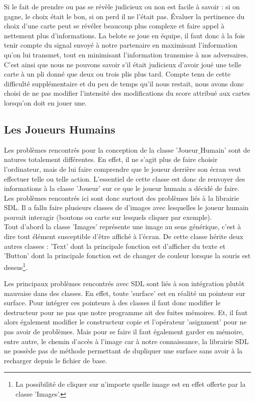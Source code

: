 \documentclass[a4paper,11pt]{article}
\begin{document}
Si le fait de prendre ou pas se révèle judicieux ou non est facile à savoir : si on gagne, le choix était le bon, si on perd il ne l'était pas. \'Evaluer la pertinence du choix d'une carte peut se révéler beaucoup plus complexe et faire appel à nettement plus d'informations. La belote se joue en équipe, il faut donc à la fois tenir compte du signal envoyé à notre partenaire en maximisant l'information qu'on lui transmet, tout en minimisant l'information transmise à nos adversaires. C'est ainsi que nous ne pouvons savoir s'il était judicieux d'avoir joué une telle carte à un pli donné que deux ou trois plis plus tard. Compte tenu de cette difficulté supplémentaire et du peu de temps qu'il nous restait, nous avons donc choisi de ne pas modifier l'intensité des modifications du score attribué aux cartes lorsqu'on doit en jouer une.
\clearpage
\subsection{Les Joueurs Humains}
Les problèmes rencontrés pour la conception de la classe 'Joueur$\_$Humain' sont de natures totalement différentes. En effet, il ne s'agit plus de faire choisir l'ordinateur, mais de lui faire comprendre que le joueur derrière son écran veut effectuer telle ou telle action. L'essentiel de cette classe est donc de renvoyer des informations à la classe 'Joueur' sur ce que le joueur humain a décidé de faire.\\

Les problèmes rencontrés ici sont donc surtout des problèmes liés à la librairie SDL. Il a fallu faire plusieurs classes de d'images avec lesquelles le joueur humain pouvait interagir (boutons ou carte sur lesquels cliquer par exemple).\\

Tout d'abord la classe 'Images' représente une image au sens générique, c'est à dire tout élément susceptible d'être affiché à l'écran. De cette classe hérite deux autres classes : 'Text' dont la principale fonction est d'afficher du texte et 'Button' dont la principale fonction est de changer de couleur lorsque la souris est dessus\footnote{La possibilité de cliquer sur n'importe quelle image est en effet offerte par la classe 'Images'.}.

Les principaux problèmes rencontrés avec SDL sont liés à son intégration plutôt mauvaise dans des classes. En effet, toute 'surface' est en réalité un pointeur sur surface. Pour intégrer ces pointeurs à des classes il faut donc modifier le destructeur pour ne pas que notre programme ait des fuites mémoires. Et, il faut alors également modifier le constructeur copie et l'opérateur 'asignment' pour ne pas avoir de problèmes. Mais pour se faire il faut également garder en mémoire, entre autre, le chemin d'accès à l'image car à notre connaissance, la librairie SDL ne possède pas de méthode permettant de dupliquer une surface sans avoir à la recharger depuis le fichier de base.
\clearpage
\end{document}
